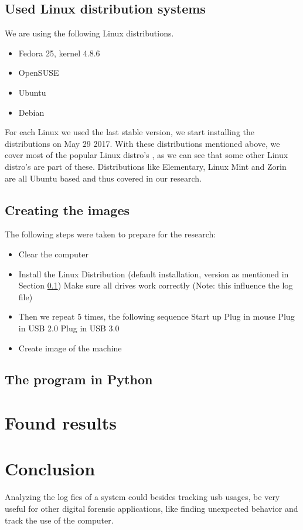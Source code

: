 \documentclass[a4paper]{article}
\begin{document}
\subsection{Used Linux distribution systems}\label{sec:usedLinux}
We are using the following Linux distributions. 
\begin{itemize}
\item Fedora 25, kernel 4.8.6
\item OpenSUSE 
\item Ubuntu 
\item Debian 
\end{itemize}
For each Linux we used the last stable version, we start installing the distributions on May 29 2017.
With these distributions mentioned above, we cover most of the popular Linux distro's \cite{LinuxDistro}, as we can see that some other Linux distro's are part of these. Distributions like Elementary, Linux Mint and  Zorin are all Ubuntu based and thus covered in our research.

\subsection{Creating the images}\label{sec:createImage}
The following steps were taken to prepare for the research:
\begin{itemize}
\item Clear the computer
\item Install the Linux Distribution (default installation, version as mentioned in Section \ref{sec:usedLinux})
\subitem Make sure all drives work correctly (Note: this influence the log file)
\item Then we repeat 5 times, the following sequence
\subitem Start up
\subitem Plug in mouse
\subitem Plug in USB 2.0
\subitem Plug in USB 3.0
\item Create image of the machine
\end{itemize}

\subsection{The program in Python}\label{sec:python}


\section{Found results}


\section{Conclusion}



Analyzing the log fies of a system could besides tracking usb usages, be very useful for other digital forensic applications, like finding unexpected behavior and track the use of the computer.




\end{document}
